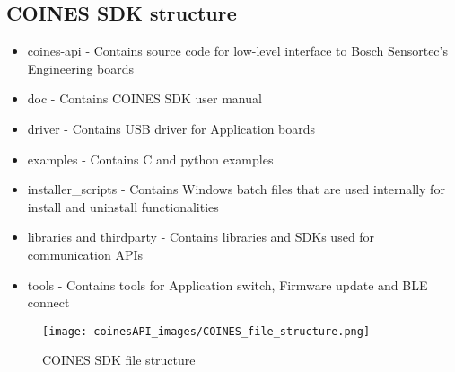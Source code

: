 \documentclass{article}
\begin{document}
\subsection{COINES SDK structure}
\begin{itemize}
	\item coines-api - Contains source code for low-level interface to Bosch Sensortec’s Engineering boards
	\item doc - Contains COINES SDK user manual
	\item driver - Contains USB driver for Application boards
	\item examples - Contains C and python examples 
	\item installer\_scripts - Contains Windows batch files that are used internally for install and uninstall functionalities
	\item libraries and thirdparty - Contains libraries and SDKs used for communication APIs
	\item tools - Contains tools for Application switch, Firmware update and BLE connect
\end{itemize}
\begin{figure}[H]
	\begin{center}
		\texttt{[image: coinesAPI\_images/COINES\_file\_structure.png]}
		\caption{COINES SDK file structure}
	\end{center}
\end{figure}
\bstlastpage
\end{document}
